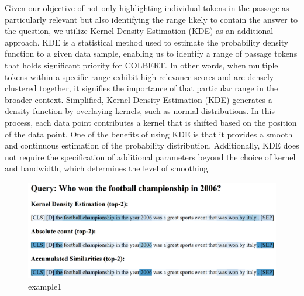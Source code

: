 \documentclass{article}
\begin{document}
Given our objective of not only highlighting individual tokens in the passage as particularly relevant but also identifying the range likely to contain the answer to the question, we utilize Kernel Density Estimation (KDE)\cite{kde} as an additional approach. 
KDE is a statistical method used to estimate the probability density function to a given data sample, enabling us to identify a range of passage tokens
that holds significant priority for COLBERT.
In other words, when multiple tokens within a specific range exhibit high relevance scores and are densely clustered together, it signifies the importance of that particular range in the broader context.
Simplified, Kernel Density Estimation (KDE) generates a density function by overlaying kernels, such as normal distributions.
In this process, each data point contributes a kernel that is shifted based on the position of the data point.
One of the benefits of using KDE is that it provides a smooth and continuous estimation of the probability distribution. 
Additionally, KDE does not require the specification of additional parameters beyond the choice of kernel and bandwidth, 
which determines the level of smoothing.

\begin{figure}[h]
	\centering
	\includegraphics[width = 13cm]{"../ressources/results/football_html.png"}
	\caption{example1}
	\label{fig:example1}
\end{figure}
\end{document}
